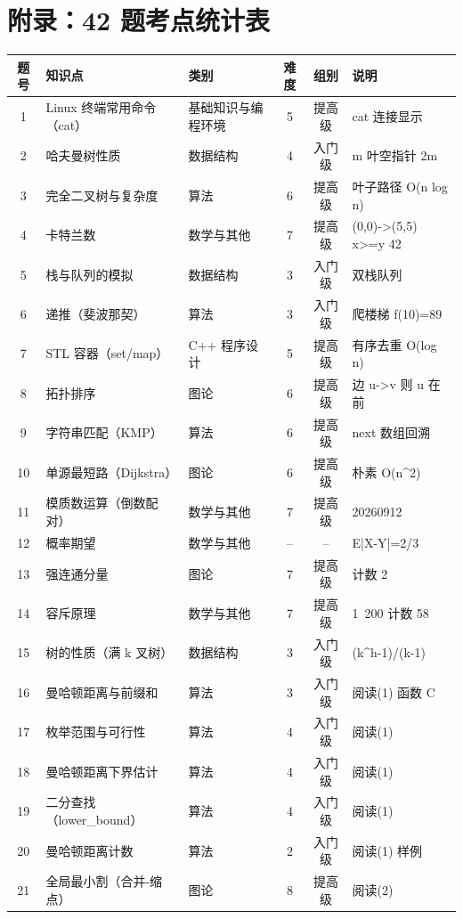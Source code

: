 \documentclass[a4paper]{ctexart}
\begin{document}
\section*{附录：42 题考点统计表}
\begingroup
\small
\begin{longtable}{cp{2.2cm}p{2.0cm}ccp{5.0cm}}
\toprule
题号 & 知识点 & 类别 & 难度 & 组别 & 说明 \\
\midrule
1  & Linux 终端常用命令（cat） & 基础知识与编程环境 & 5 & 提高级 & cat 连接显示 \ \\
2  & 哈夫曼树性质 & 数据结构 & 4 & 入门级 & m 叶空指针 2m \ \\
3  & 完全二叉树与复杂度 & 算法 & 6 & 提高级 & 叶子路径 O(n log n) \ \\
4  & 卡特兰数 & 数学与其他 & 7 & 提高级 & (0,0)->(5,5) x>=y 42 \ \\
5  & 栈与队列的模拟 & 数据结构 & 3 & 入门级 & 双栈队列 \ \\
6  & 递推（斐波那契） & 算法 & 3 & 入门级 & 爬楼梯 f(10)=89 \\
7  & STL 容器（set/map） & C++ 程序设计 & 5 & 提高级 & 有序去重 O(log n) \\
8  & 拓扑排序 & 图论 & 6 & 提高级 & 边 u->v 则 u 在前 \\
9  & 字符串匹配（KMP） & 算法 & 6 & 提高级 & next 数组回溯 \\
10  & 单源最短路（Dijkstra） & 图论 & 6 & 提高级 & 朴素 O(n\^{}2) \ \\
11  & 模质数运算（倒数配对） & 数学与其他 & 7 & 提高级 & 20260912 \\
12  & 概率期望 & 数学与其他 & -- & -- & E|X-Y|=2/3 \ \\
13  & 强连通分量 & 图论 & 7 & 提高级 & 计数 2 \ \\
14  & 容斥原理 & 数学与其他 & 7 & 提高级 & 1~200 计数 58 \ \\
15  & 树的性质（满 k 叉树） & 数据结构 & 3 & 入门级 & (k\^{}h-1)/(k-1) \ \\
16  & 曼哈顿距离与前缀和 & 算法 & 3 & 入门级 & 阅读(1) 函数 C \ \\
17  & 枚举范围与可行性 & 算法 & 4 & 入门级 & 阅读(1) \ \\
18  & 曼哈顿距离下界估计 & 算法 & 4 & 入门级 & 阅读(1) \ \\
19  & 二分查找（lower\_bound） & 算法 & 4 & 入门级 & 阅读(1) \ \\
20  & 曼哈顿距离计数 & 算法 & 2 & 入门级 & 阅读(1) 样例 \ \\
21  & 全局最小割（合并-缩点） & 图论 & 8 & 提高级 & 阅读(2) \ \\

\end{longtable}
\end{document}
